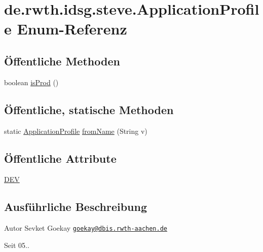 \hypertarget{enumde_1_1rwth_1_1idsg_1_1steve_1_1_application_profile}{\section{de.\+rwth.\+idsg.\+steve.\+Application\+Profile Enum-\/\+Referenz}
\label{enumde_1_1rwth_1_1idsg_1_1steve_1_1_application_profile}
}
\subsection*{Öffentliche Methoden}
\begin{DoxyCompactItemize}
\item 
boolean \hyperlink{enumde_1_1rwth_1_1idsg_1_1steve_1_1_application_profile_a3c96eb2196584ccf04e8dce5fb1cbf12}{is\+Prod} ()
\end{DoxyCompactItemize}
\subsection*{Öffentliche, statische Methoden}
\begin{DoxyCompactItemize}
\item 
static \hyperlink{enumde_1_1rwth_1_1idsg_1_1steve_1_1_application_profile}{Application\+Profile} \hyperlink{enumde_1_1rwth_1_1idsg_1_1steve_1_1_application_profile_afd65166694416ce9a6ac05ba32dd3e32}{from\+Name} (String v)
\end{DoxyCompactItemize}
\subsection*{Öffentliche Attribute}
\begin{DoxyCompactItemize}
\item 
\hyperlink{enumde_1_1rwth_1_1idsg_1_1steve_1_1_application_profile_aea823c53d450f28193364cc9621731f6}{D\+E\+V}
\end{DoxyCompactItemize}


\subsection{Ausführliche Beschreibung}
\begin{DoxyAuthor}{Autor}
Sevket Goekay \href{mailto:goekay@dbis.rwth-aachen.de}{\tt goekay@dbis.\+rwth-\/aachen.\+de} 
\end{DoxyAuthor}
\begin{DoxySince}{Seit}
05.. 
\end{DoxySince}


